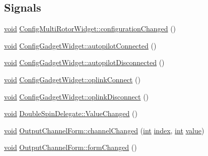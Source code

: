 \subsection*{Signals}
\begin{DoxyCompactItemize}
\item 
\hyperlink{group___u_a_v_objects_plugin_ga444cf2ff3f0ecbe028adce838d373f5c}{void} \hyperlink{group___config_plugin_ga716e8f2fab4b0afb5b3c2df16b199259}{Config\-Multi\-Rotor\-Widget\-::configuration\-Changed} ()
\item 
\hyperlink{group___u_a_v_objects_plugin_ga444cf2ff3f0ecbe028adce838d373f5c}{void} \hyperlink{group___config_plugin_ga5c7aaec226341fec654b07be4cdcd807}{Config\-Gadget\-Widget\-::autopilot\-Connected} ()
\item 
\hyperlink{group___u_a_v_objects_plugin_ga444cf2ff3f0ecbe028adce838d373f5c}{void} \hyperlink{group___config_plugin_ga1ba3ecc94d2a793f945493631cc7be34}{Config\-Gadget\-Widget\-::autopilot\-Disconnected} ()
\item 
\hyperlink{group___u_a_v_objects_plugin_ga444cf2ff3f0ecbe028adce838d373f5c}{void} \hyperlink{group___config_plugin_ga672206f813d7364dc6bd71140773c828}{Config\-Gadget\-Widget\-::oplink\-Connect} ()
\item 
\hyperlink{group___u_a_v_objects_plugin_ga444cf2ff3f0ecbe028adce838d373f5c}{void} \hyperlink{group___config_plugin_gad5ee6c6370ca04c5da447e4ba0304f0b}{Config\-Gadget\-Widget\-::oplink\-Disconnect} ()
\item 
\hyperlink{group___u_a_v_objects_plugin_ga444cf2ff3f0ecbe028adce838d373f5c}{void} \hyperlink{group___config_plugin_ga71be1aadf5a0d023bda52f505cf7306f}{Double\-Spin\-Delegate\-::\-Value\-Changed} ()
\item 
\hyperlink{group___u_a_v_objects_plugin_ga444cf2ff3f0ecbe028adce838d373f5c}{void} \hyperlink{group___config_plugin_gabf138ec695ffe189e33d200b031e2687}{Output\-Channel\-Form\-::channel\-Changed} (\hyperlink{ioapi_8h_a787fa3cf048117ba7123753c1e74fcd6}{int} \hyperlink{glext_8h_ab47dd9958bcadea08866b42bf358e95e}{index}, \hyperlink{ioapi_8h_a787fa3cf048117ba7123753c1e74fcd6}{int} \hyperlink{glext_8h_aa0e2e9cea7f208d28acda0480144beb0}{value})
\item 
\hyperlink{group___u_a_v_objects_plugin_ga444cf2ff3f0ecbe028adce838d373f5c}{void} \hyperlink{group___config_plugin_gaa777808eac827fbf95642188024fc667}{Output\-Channel\-Form\-::form\-Changed} ()
\end{DoxyCompactItemize}
